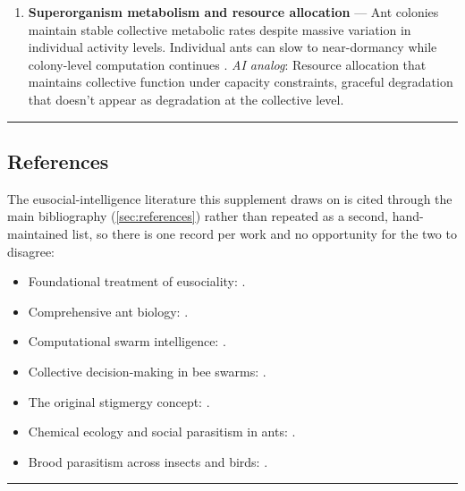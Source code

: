 \documentclass[
]{article}
\providecommand{\tightlist}{%
  \setlength{\itemsep}{0pt}\setlength{\parskip}{0pt}}
\begin{document}
\begin{enumerate}
  depending on context \citep{vander1998alarm}. \emph{AI analog}:
  Context-dependent escalation policies where the same anomaly triggers
  different responses based on system state.
\item
  \textbf{Superorganism metabolism and resource allocation} --- Ant
  colonies maintain stable collective metabolic rates despite massive
  variation in individual activity levels. Individual ants can slow to
  near-dormancy while colony-level computation continues
  \citep{waters2010metabolism}. \emph{AI analog}: Resource allocation
  that maintains collective function under capacity constraints,
  graceful degradation that doesn't appear as degradation at the
  collective level.
\end{enumerate}

\begin{center}\rule{0.5\linewidth}{0.5pt}\end{center}

\subsection{References}\label{sec:eusocial-references}

The eusocial-intelligence literature this supplement draws on is cited
through the main bibliography (\cref{sec:references}) rather than
repeated as a second, hand-maintained list, so there is one record per
work and no opportunity for the two to disagree:

\begin{itemize}
\tightlist
\item
  Foundational treatment of eusociality: \cite{wilson1971insect}.
\item
  Comprehensive ant biology: \cite{holldobler1990ants}.
\item
  Computational swarm intelligence: \cite{bonabeau1999swarm}.
\item
  Collective decision-making in bee swarms: \cite{seeley2010honeybee}.
\item
  The original stigmergy concept: \cite{grasse1959reconstruction}.
\item
  Chemical ecology and social parasitism in ants:
  \cite{lenoir2001chemical}.
\item
  Brood parasitism across insects and birds: \cite{kilner2011cuckoos}.
\end{itemize}

\begin{center}\rule{0.5\linewidth}{0.5pt}\end{center}
\end{document}
